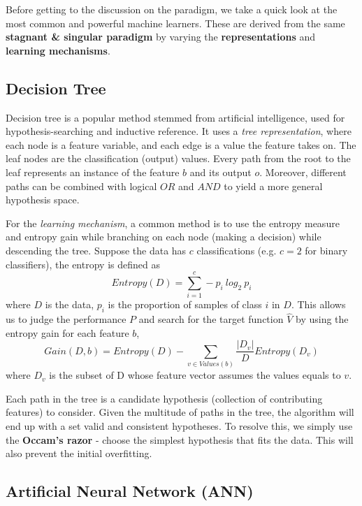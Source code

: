 \documentclass[12pt]{article}  %
\begin{document}

Before getting to the discussion on the paradigm, we take a quick look at the most common and powerful machine learners. These are derived from the same {\bf stagnant \& singular paradigm} by varying the {\bf representations} and {\bf learning mechanisms}.



\subsection{Decision Tree}

Decision tree is a popular method stemmed from artificial intelligence, used for hypothesis-searching and inductive reference. It uses a {\em tree representation}, where each node is a feature variable, and each edge is a value the feature takes on. The leaf nodes are the classification (output) values. Every path from the root to the leaf represents an instance of the feature $b$ and its output $o$. Moreover, different paths can be combined with logical $OR$ and $AND$ to yield a more general hypothesis space.

For the {\em learning mechanism}, a common method is to use the entropy measure and entropy gain while branching on each node (making a decision) while descending the tree. Suppose the data has $c$ classifications (e.g. $c=2$ for binary classifiers), the entropy is defined as $$Entropy(D) = \sum_{i=1}^{c} -p_i \ log_2 \ p_i$$ where $D$ is the data, $p_i$ is the proportion of samples of class $i$ in $D$. This allows us to judge the performance $P$ and search for the target function $\hat{V}$ by using the entropy gain for each feature $b$, $$Gain(D,b) = Entropy(D) - \sum_{v\in Values(b)} \frac{|D_v|}{D} Entropy(D_v)$$ where $D_v$ is the subset of D whose feature vector assumes the values equals to $v$.

Each path in the tree is a candidate hypothesis (collection of contributing features) to consider. Given the multitude of paths in the tree, the algorithm will end up with a set valid and consistent hypotheses. To resolve this, we simply use the {\bf Occam's razor} - choose the simplest hypothesis that fits the data. This will also prevent the initial overfitting.



\subsection{Artificial Neural Network (ANN)}
\end{document}
